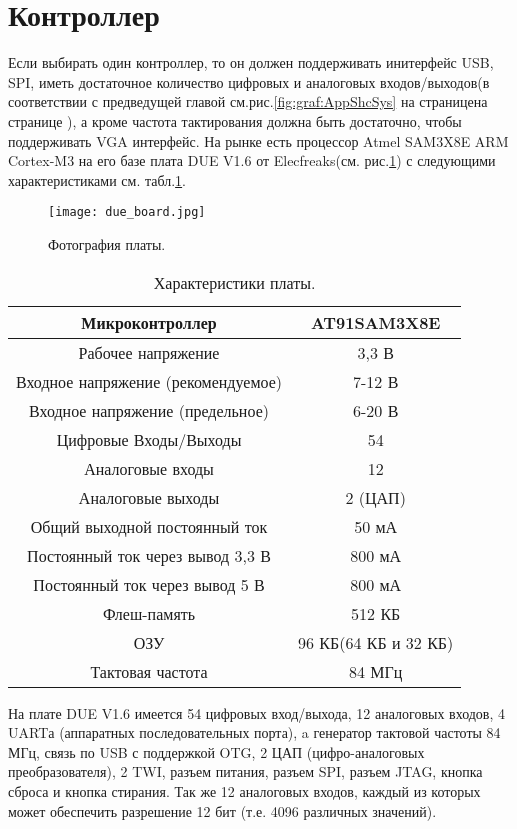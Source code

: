 \section{Контроллер}
Если выбирать один контроллер, то он должен поддерживать инитерфейс USB, SPI, иметь достаточное количество цифровых и аналоговых входов/выходов(в соответствии с предведущей главой см.рис.\ref{fig:graf:AppShcSys} на страницена странице \pageref{fig:graf:AppShcSys}), а кроме частота тактирования должна быть достаточно, чтобы поддерживать VGA интерфейс. На рынке есть процессор Atmel SAM3X8E ARM Cortex-M3 на его базе плата DUE V1.6 от Elecfreaks(см. рис.\ref{fig:DueBoard}) с следующими характеристиками см. табл.\ref{tab:DueBoard}\cite{s_1}.
\begin{figure}[ht]
	\centering
     \texttt{[image: due\_board.jpg]}
	\caption{Фотография платы.}
	\label{fig:DueBoard}
\end{figure}
\begin{table}
\centering
\begin{tabular}{|c|c|}
\hline 
Микроконтроллер & AT91SAM3X8E \\ 
\hline 
Рабочее напряжение & 3,3 В \\ 
\hline 
Входное напряжение (рекомендуемое) & 7-12 В \\ 
\hline 
Входное напряжение (предельное) & 6-20 В \\ 
\hline 
Цифровые Входы/Выходы & 54 \\ 
\hline 
Аналоговые входы & 12 \\ 
\hline 
Аналоговые выходы & 2 (ЦАП) \\ 
\hline 
Общий выходной постоянный ток & 50 мА \\ 
\hline 
Постоянный ток через вывод 3,3 В & 800 мА \\ 
\hline 
Постоянный ток через вывод 5 В & 800 мА \\ 
\hline 
Флеш-память & 512 КБ \\ 
\hline 
ОЗУ & 96 КБ(64 КБ и 32 КБ)\\ 
\hline 
Тактовая частота & 84 МГц \\ 
\hline 
\end{tabular} 
\caption{Характеристики платы.}
\label{tab:DueBoard}
\end{table}
На плате DUE V1.6 имеется 54 цифровых вход/выхода, 12 аналоговых входов, 4 UARTа (аппаратных последовательных порта), a генератор тактовой частоты 84 МГц, связь по USB с поддержкой OTG, 2 ЦАП (цифро-аналоговых преобразователя), 2 TWI, разъем питания,  разъем SPI, разъем JTAG, кнопка сброса и кнопка стирания. Так же 12 аналоговых входов, каждый из которых может обеспечить разрешение 12 бит (т.е. 4096 различных значений).

